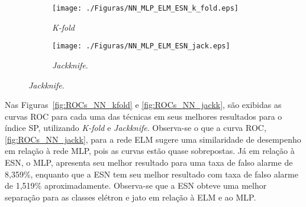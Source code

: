 




\begin{figure}[H]
		\caption{\textit{Boxplot} das melhores redes para ELM, ESN e MLP na base experimental.}
		\label{fig:ELMxESNxBP_NN}
	\begin{subfigure}[t]{.5\linewidth}
		\caption{\textit{K-fold}}
		\centerline{\texttt{[image: ./Figuras/NN\_MLP\_ELM\_ESN\_k\_fold.eps]}}
		\label{fig:ELMxESNxBP_NN_k}
	\end{subfigure}
	\begin{subfigure}[t]{.5\linewidth}
		\caption{\textit{Jackknife}.}
		\centerline{\texttt{[image: ./Figuras/NN\_MLP\_ELM\_ESN\_jack.eps]}}
		\label{fig:ELMxESNxBP_NN_j}
	\end{subfigure}
\end{figure}

Nas Figuras~\ref{fig:ROCs_NN_kfold} e \ref{fig:ROCs_NN_jackk}, são exibidas as curvas ROC para cada uma das técnicas em seus melhores resultados para o índice SP, utilizando \textit{K-fold} e \textit{Jackknife}. Observa-se o que a curva ROC, \autoref{fig:ROCs_NN_jackk}, para a rede ELM sugere uma similaridade de desempenho em relação à rede MLP, pois as curvas estão quase sobrepostas. Já em relação à ESN, o MLP, apresenta seu melhor resultado para uma taxa de falso alarme de 8,359\%, enquanto que a ESN tem seu melhor resultado com taxa de falso alarme de 1,519\% aproximadamente. Observa-se que a ESN obteve uma melhor separação para as classes elétron e jato em relação à ELM e ao MLP.%

